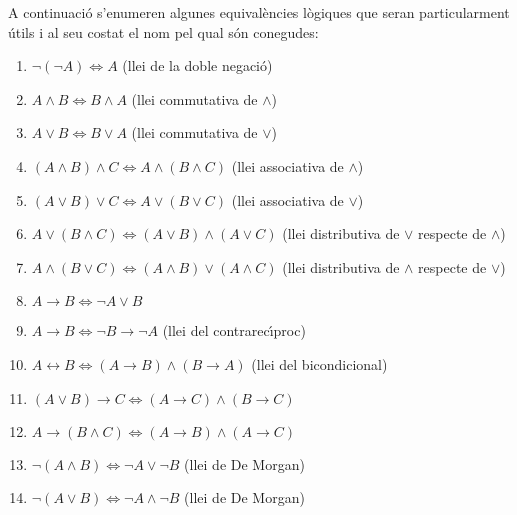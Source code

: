 A continuaci\'{o} s'enumeren algunes equival\`{e}ncies l\`{o}giques que
seran particularment \'{u}tils i al seu costat el nom pel qual s\'{o}n
conegudes:

\begin{enumerate}
\item $\lnot\left( \lnot A\right) \Longleftrightarrow A$ (llei de la doble
negaci\'{o})

\item $A\wedge B\Longleftrightarrow B\wedge A$ (llei commutativa de $\wedge$)

\item $A\vee B\Longleftrightarrow B\vee A$ (llei commutativa de $\vee$)

\item $\left( A\wedge B\right) \wedge C\Longleftrightarrow A\wedge\left(
B\wedge C\right) $ (llei associativa de $\wedge$)

\item $\left( A\vee B\right) \vee C\Longleftrightarrow A\vee\left( B\vee
C\right) $ (llei associativa de $\vee$)

\item $A\vee\left( B\wedge C\right) \Longleftrightarrow\left( A\vee B\right)
\wedge\left( A\vee C\right) $ (llei distributiva de $\vee$ respecte de $%
\wedge$)

\item $A\wedge\left( B\vee C\right) \Longleftrightarrow\left( A\wedge
B\right) \vee\left( A\wedge C\right) $ (llei distributiva de $\wedge$
respecte de $\vee$)

\item $A\longrightarrow B\Longleftrightarrow\lnot A\vee B$

\item $A\longrightarrow B\Longleftrightarrow\lnot B\longrightarrow\lnot A$
(llei del contrarec\'{\i}proc)

\item $A\longleftrightarrow B\Longleftrightarrow\left( A\longrightarrow
B\right) \wedge\left( B\longrightarrow A\right) $ (llei del bicondicional)

\item $\left( A\vee B\right) \longrightarrow C\Longleftrightarrow\left(
A\longrightarrow C\right) \wedge\left( B\longrightarrow C\right) $

\item $A\longrightarrow\left( B\wedge C\right) \Longleftrightarrow\left(
A\longrightarrow B\right) \wedge\left( A\longrightarrow C\right) $

\item $\lnot(A\wedge B)\Longleftrightarrow\lnot A\vee\lnot B$ (llei de De
Morgan)

\item $\lnot(A\vee B)\Longleftrightarrow\lnot A\wedge\lnot B$ (llei de De
Morgan)
\end{enumerate}

